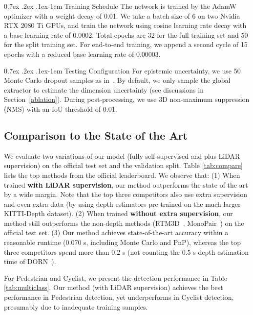 \documentclass[10pt,twocolumn,letterpaper]{article}
\makeatletter
\renewcommand{\paragraph}{
  \@startsection{paragraph}{4}
  {\z@}{0.7ex \@plus .2ex \@minus .1ex}{-1em}
  {\normalfont\normalsize\bfseries}
}
\makeatother
\begin{document}
\paragraph{Training Schedule}
The network is trained by the AdamW~\cite{adamw} optimizer with a weight decay of 0.01.
We take a batch size of 6 on two Nvidia RTX 2080 Ti GPUs,
and train the network using cosine learning rate decay with a base learning rate of 0.0002. Total epochs are 32 for the full training set and 50 for the split training set. For end-to-end training, we append a second cycle of 15 epochs with a reduced base learning rate of 0.00003.

\paragraph{Testing Configuration}
For epistemic uncertainty, we use 50 Monte Carlo dropout samples as in~\cite{kendall2017uncertainties}. By default, we only sample the global extractor to estimate the dimension uncertainty (see discussions in Section~\ref{ablation}). During post-processing, we use 3D non-maximum suppression (NMS) with an IoU threshold of 0.01.

\subsection{Comparison to the State of the Art}
We evaluate two variations of our model (fully self-supervised and plus LiDAR supervision) on the official test set and the validation split. Table \ref{tab:compare} lists the top methods from the official leaderboard. We observe that: (1) When trained \textbf{with LiDAR supervision}, our method outperforms the state of the art by a wide margin. Note that the top three competitors also use extra supervision and even extra data (by using depth estimators pre-trained on the much larger KITTI-Depth dataset). (2) When trained \textbf{without extra supervision}, our method still outperforms the non-depth methods (RTM3D~\cite{RTM3D}, MonoPair~\cite{monopair}) on the official test set. (3) Our method achieves state-of-the-art accuracy within a reasonable runtime (0.070 s, including Monte Carlo and PnP), whereas the top three competitors spend more than 0.2 s (not counting the 0.5 s depth estimation time of DORN~\cite{DORN}).

For Pedestrian and Cyclist, we present the detection performance in Table \ref{tab:multiclass}. Our method (with LiDAR supervision) achieves the best performance in Pedestrian detection, yet underperforms in Cyclist detection, presumably due to inadequate training samples.
\end{document}
